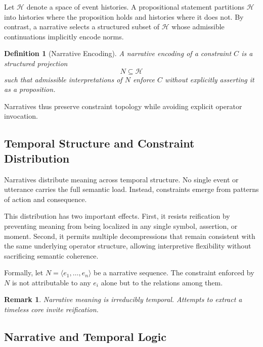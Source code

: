 \documentclass[11pt]{article}
\newtheorem{definition}{Definition}
\newtheorem{remark}{Remark}
\newcommand{\Hist}{\mathcal{H}}
\begin{document}
Let $\Hist$ denote a space of event histories. A propositional statement
partitions $\Hist$ into histories where the proposition holds and histories where
it does not. By contrast, a narrative selects a structured subset of $\Hist$
whose admissible continuations implicitly encode norms.

\begin{definition}[Narrative Encoding]
A narrative encoding of a constraint $C$ is a structured projection
\[
N \subseteq \Hist
\]
such that admissible interpretations of $N$ enforce $C$ without explicitly
asserting it as a proposition.
\end{definition}

Narratives thus preserve constraint topology while avoiding explicit operator
invocation.

\subsection{Temporal Structure and Constraint Distribution}

Narratives distribute meaning across temporal structure. No single event or
utterance carries the full semantic load. Instead, constraints emerge from
patterns of action and consequence.

This distribution has two important effects. First, it resists reification by
preventing meaning from being localized in any single symbol, assertion, or
moment. Second, it permits multiple decompressions that remain consistent with
the same underlying operator structure, allowing interpretive flexibility
without sacrificing semantic coherence.

Formally, let $N = \langle e_1, \dots, e_n \rangle$ be a narrative sequence. The
constraint enforced by $N$ is not attributable to any $e_i$ alone but to the
relations among them.

\begin{remark}
Narrative meaning is irreducibly temporal. Attempts to extract a timeless core
invite reification.
\end{remark}

\subsection{Narrative and Temporal Logic}
\end{document}
